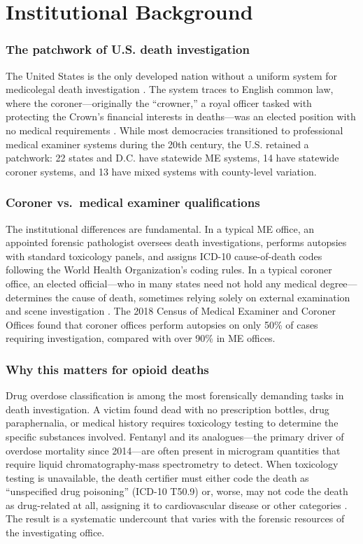 \documentclass[12pt]{article}
\begin{document}
\section{Institutional Background}

\subsubsection*{The patchwork of U.S. death investigation} The United States is the only developed nation without a uniform system for medicolegal death investigation \citep{nrc2009strengthening}. The system traces to English common law, where the coroner---originally the ``crowner,'' a royal officer tasked with protecting the Crown's financial interests in deaths---was an elected position with no medical requirements \citep{hanzlick2006overview}. While most democracies transitioned to professional medical examiner systems during the 20th century, the U.S. retained a patchwork: 22 states and D.C. have statewide ME systems, 14 have statewide coroner systems, and 13 have mixed systems with county-level variation.

\subsubsection*{Coroner vs.\ medical examiner qualifications} The institutional differences are fundamental. In a typical ME office, an appointed forensic pathologist oversees death investigations, performs autopsies with standard toxicology panels, and assigns ICD-10 cause-of-death codes following the World Health Organization's coding rules. In a typical coroner office, an elected official---who in many states need not hold any medical degree---determines the cause of death, sometimes relying solely on external examination and scene investigation \citep{bjs_comec_2018}. The 2018 Census of Medical Examiner and Coroner Offices found that coroner offices perform autopsies on only 50\% of cases requiring investigation, compared with over 90\% in ME offices.

\subsubsection*{Why this matters for opioid deaths} Drug overdose classification is among the most forensically demanding tasks in death investigation. A victim found dead with no prescription bottles, drug paraphernalia, or medical history requires toxicology testing to determine the specific substances involved. Fentanyl and its analogues---the primary driver of overdose mortality since 2014---are often present in microgram quantities that require liquid chromatography-mass spectrometry to detect. When toxicology testing is unavailable, the death certifier must either code the death as ``unspecified drug poisoning'' (ICD-10 T50.9) or, worse, may not code the death as drug-related at all, assigning it to cardiovascular disease or other categories \citep{warner2013drugs}. The result is a systematic undercount that varies with the forensic resources of the investigating office.
\end{document}
